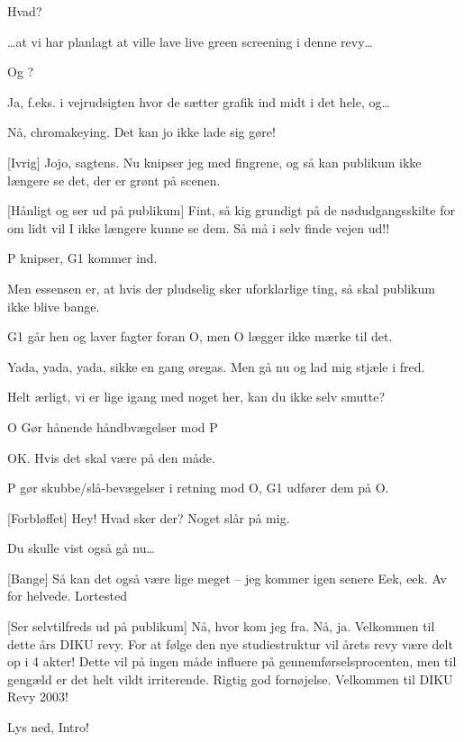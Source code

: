 \documentclass[a4paper]{article}
\begin{document}
\begin{sketch}
   Hvad?
  
   \ldots  at vi har planlagt at ville lave live green screening i
  denne revy\ldots
  
   Og ?
  
   Ja, f.eks. i vejrudsigten hvor de sætter grafik ind midt i
  det hele, og\ldots
  
   Nå, chromakeying. Det kan jo ikke lade sig gøre!
  
  [Ivrig] Jojo, sagtens. Nu knipser jeg med fingrene, og så kan
  publikum ikke længere se det, der er grønt på scenen.
  
   [Hånligt og ser ud på publikum] Fint, så kig grundigt på de
  nødudgangsskilte for om lidt vil I ikke længere kunne se dem. Så må i selv
  finde vejen ud!! 

  \scene P knipser, G1 kommer ind.
  
   Men essensen er, at hvis der pludselig sker uforklarlige ting, så
  skal publikum ikke blive bange.

  \scene G1 går hen og laver fagter foran O, men O lægger ikke mærke til det.

   Yada, yada, yada, sikke en gang øregas. Men gå nu og lad mig stjæle
  i fred.
  
   Helt ærligt, vi er lige igang med noget her, kan du ikke selv
  smutte?

  \scene O Gør hånende håndbvægelser mod P
  
   OK. Hvis det skal være på den måde.

  \scene P gør skubbe/slå-bevægelser i retning mod O, G1 udfører dem på O.
  
  [Forbløffet] Hey! Hvad sker der? Noget slår på mig.

   Du skulle vist også gå nu\ldots

  [Bange] Så kan det også være lige meget -- jeg kommer igen senere
     Eek, eek. Av
    for helvede. Lortested
  
  [Ser selvtilfreds ud på publikum] Nå, hvor kom jeg fra. Nå, ja.
  Velkommen til dette års DIKU revy. For at følge den nye
  studiestruktur vil årets revy være delt op i 4 akter! Dette vil på
  ingen måde influere på gennemførselsprocenten, men til gengæld er
  det helt vildt irriterende. Rigtig god fornøjelse. Velkommen til DIKU Revy
  2003! 
  
  \scene Lys ned, Intro!

\end{sketch}
\end{document}
